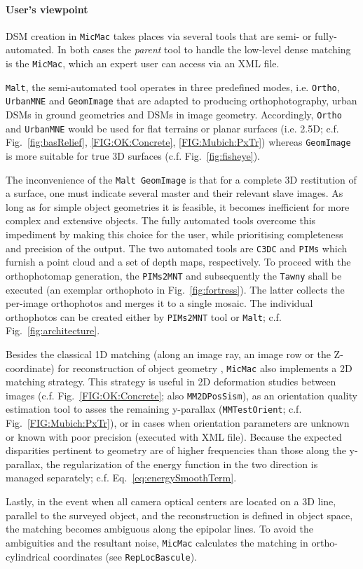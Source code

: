 \documentclass[twocolumn]{bmcart}%
\begin{document}
\paragraph*{User's viewpoint}
DSM creation in {\tt MicMac} takes places via several tools that are semi- or fully-automated. In both cases the \textit{parent} tool to handle the low-level dense matching is the {\tt MicMac}, which an expert user can access via an XML file.\par 
%
{\tt Malt}, the semi-automated tool operates in three predefined modes, i.e. {\tt Ortho}, {\tt UrbanMNE} and {\tt GeomImage} that are adapted to producing orthophotography, urban DSMs in ground geometries and DSMs in image geometry. Accordingly, {\tt Ortho} and {\tt UrbanMNE} would be used for flat terrains or planar surfaces (i.e. 2.5D; c.f. Fig.~\ref{fig:basRelief}, \ref{FIG:OK:Concrete}, \ref{FIG:Mubich:PxTr}) whereas {\tt GeomImage} is more suitable for true 3D surfaces (c.f. Fig.~\ref{fig:fisheye}).\par 
%
The inconvenience of the {\tt Malt GeomImage} is that for a complete 3D restitution of a surface, one must indicate several master and their relevant slave images. As long as for simple object geometries it is feasible, it becomes inefficient for more complex and extensive objects. The fully automated tools overcome this impediment by making this choice for the user, while prioritising completeness and precision of the output. The two automated tools are {\tt C3DC} and {\tt PIMs} which furnish a point cloud and a set of depth maps, respectively. To proceed with the orthophotomap generation, the {\tt PIMs2MNT} and subsequently the {\tt Tawny} shall be executed (an exemplar orthophoto in Fig.~\ref{fig:fortress}). The latter collects the per-image orthophotos and merges it to a single mosaic. The individual orthophotos can be created either by {\tt PIMs2MNT} tool or {\tt Malt}; c.f. Fig.~\ref{fig:architecture}.\par 
%
Besides the classical 1D matching (along an image ray, an image row or the Z-coordinate) for reconstruction of object geometry , {\tt MicMac} also implements a 2D matching strategy. This strategy is useful in 2D deformation studies between images (c.f. Fig.~\ref{FIG:OK:Concrete}; also {\tt MM2DPosSism}), as an orientation quality estimation tool to asses the remaining y-parallax ({\tt MMTestOrient}; c.f. Fig.~\ref{FIG:Mubich:PxTr}), or in cases when orientation parameters are unknown or known with poor precision (executed with XML file). Because the expected disparities pertinent to geometry are of higher frequencies than those along the y-parallax, the regularization of the energy function in the two direction is managed separately; c.f. Eq.~\eqref{eq:energySmoothTerm}.\par 
%
Lastly, in the event when all camera optical centers are located on a 3D line, parallel to the surveyed object, and the reconstruction is defined in object space, the matching becomes ambiguous along the epipolar lines. To avoid the ambiguities and the resultant noise, {\tt MicMac} calculates the matching in ortho-cylindrical coordinates (see {\tt RepLocBascule}).
\end{document}
